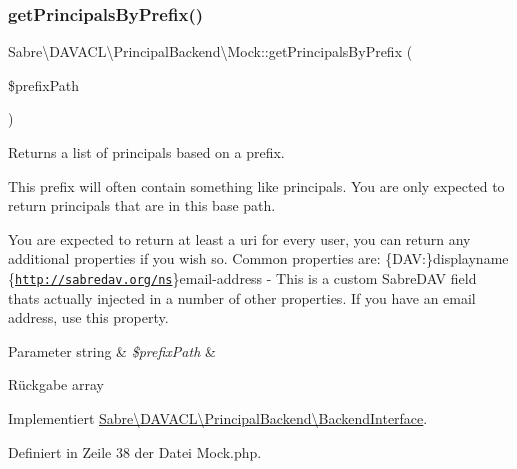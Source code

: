 \subsubsection{\texorpdfstring{get\+Principals\+By\+Prefix()}{getPrincipalsByPrefix()}}
{\footnotesize\ttfamily Sabre\textbackslash{}\+D\+A\+V\+A\+C\+L\textbackslash{}\+Principal\+Backend\textbackslash{}\+Mock\+::get\+Principals\+By\+Prefix (\begin{DoxyParamCaption}\item[{}]{\$prefix\+Path }\end{DoxyParamCaption})}

Returns a list of principals based on a prefix.

This prefix will often contain something like \textquotesingle{}principals\textquotesingle{}. You are only expected to return principals that are in this base path.

You are expected to return at least a \textquotesingle{}uri\textquotesingle{} for every user, you can return any additional properties if you wish so. Common properties are\+: \{D\+AV\+:\}displayname \{\href{http://sabredav.org/ns}{\tt http\+://sabredav.\+org/ns}\}email-\/address -\/ This is a custom Sabre\+D\+AV field that\textquotesingle{}s actually injected in a number of other properties. If you have an email address, use this property.


\begin{DoxyParams}[1]{Parameter}
string & {\em \$prefix\+Path} & \\
\hline
\end{DoxyParams}
\begin{DoxyReturn}{Rückgabe}
array 
\end{DoxyReturn}


Implementiert \mbox{\hyperlink{interface_sabre_1_1_d_a_v_a_c_l_1_1_principal_backend_1_1_backend_interface_a8f5e0aa27706302146b96b9d09bbe195}{Sabre\textbackslash{}\+D\+A\+V\+A\+C\+L\textbackslash{}\+Principal\+Backend\textbackslash{}\+Backend\+Interface}}.



Definiert in Zeile 38 der Datei Mock.\+php.

\mbox{\label{class_sabre_1_1_d_a_v_a_c_l_1_1_principal_backend_1_1_mock_a570cb9500a7dd4a3f416bfc60dc837d5}} 
